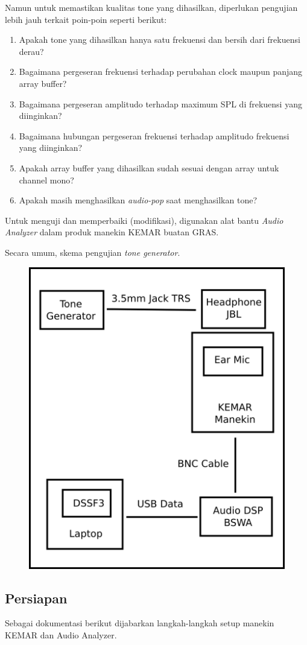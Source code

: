 \documentclass[12pt,]{article}
\begin{document}
	Namun untuk memastikan kualitas tone yang dihasilkan,
	diperlukan pengujian lebih jauh terkait poin-poin seperti berikut:
	\begin{enumerate}
		\item Apakah tone yang dihasilkan hanya satu frekuensi dan bersih dari frekuensi derau?
		\item Bagaimana pergeseran frekuensi terhadap perubahan clock maupun panjang array buffer?
		\item Bagaimana pergeseran amplitudo terhadap maximum SPL di frekuensi yang diinginkan?
		\item Bagaimana hubungan pergeseran frekuensi terhadap amplitudo frekuensi yang diinginkan?
		\item Apakah array buffer yang dihasilkan sudah sesuai dengan array untuk channel mono?
		\item Apakah masih menghasilkan \textit{audio-pop} saat menghasilkan tone?
	\end{enumerate}

	Untuk menguji dan memperbaiki (modifikasi), digunakan alat bantu \textit{Audio Analyzer} dalam
	produk manekin KEMAR buatan GRAS.

	Secara umum, skema pengujian \textit{tone generator}.

	\begin{figure}[H]
		\centering
		\includegraphics[width=0.5\linewidth]{images/kemar}
	\end{figure}

	\subsection{Persiapan}

	Sebagai dokumentasi berikut dijabarkan langkah-langkah setup manekin KEMAR dan Audio Analyzer.
\end{document}

